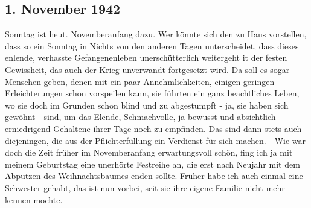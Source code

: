\subsection{1. November 1942}

Sonntag ist heut.
Novemberanfang dazu.
Wer k\"{o}nnte sich den zu Haus vorstellen, dass so ein Sonntag in Nichts von den anderen Tagen unterscheidet, dass dieses enlende, verhasste Gefangenenleben unersch\"{u}tterlich weitergeht  it der festen Gewissheit, das auch der Krieg unverwandt fortgesetzt wird.
Da soll es sogar Menschen geben, denen mit ein paar Annehmlichkeiten, einigen geringen Erleichterungen schon vorspeilen kann, sie f\"{u}hrten ein ganz beachtliches Leben, wo sie doch im Grunden schon blind  und zu abgestumpft - ja, sie haben sich gew\"{o}hnt - sind, um das Elende, Schmachvolle, ja bewusst und absichtlich erniedrigend Gehaltene ihrer Tage noch zu empfinden.
Das sind dann stets auch diejeningen, die aus der Pflichterf\"{u}llung ein Verdienst f\"{u}r sich machen.
- Wie war doch die Zeit fr\"{u}her im Novemberanfang erwartungsvoll sch\"{o}n, fing ich ja mit meinem Geburtstag eine unerh\"{o}rte Festreihe an, die erst nach Neujahr mit dem Abputzen des Weihnachtsbaumes enden sollte.
Fr\"{u}her habe ich auch einmal eine Schwester gehabt, das ist nun vorbei, seit sie ihre eigene Familie nicht mehr kennen mochte.


\clearpage
